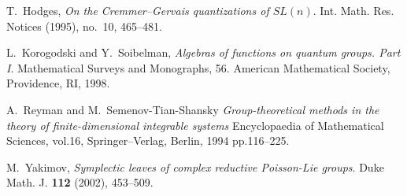\documentclass{amsart}
\theoremstyle{definition}
\theoremstyle{remark}
\numberwithin{equation}{section}
\numberwithin{theorem}{section}
\begin{document}
\begin{thebibliography}{GSV7}
 T.~Hodges,
\textit{On the Cremmer--Gervais quantizations of $SL(n)$}.
Int. Math. Res. Notices (1995), no.~10, 465--481.

  L.~Korogodski and  Y.~Soibelman, 
\textit{Algebras of functions on quantum groups. Part I}. 
Mathematical Surveys and Monographs, 56. American Mathematical Society, Providence, RI, 1998.

  A.~Reyman and M.~Semenov-Tian-Shansky
\textit{Group-theoretical methods in the theory of
finite-dimensional integrable systems} Encyclopaedia of
Mathematical Sciences, vol.16, Springer--Verlag, Berlin, 1994 pp.116--225.

 M.~Yakimov, 
\textit{Symplectic leaves of complex reductive Poisson-Lie groups}.
Duke Math. J. {\bf 112} (2002), 453--509.

\end{thebibliography}
 
 
 
\end{document}
